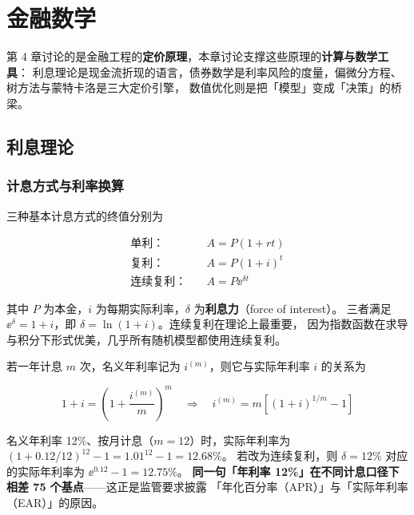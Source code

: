 \chapter{金融数学}

第 4 章讨论的是金融工程的\textbf{定价原理}，本章讨论支撑这些原理的\textbf{计算与数学工具}：
利息理论是现金流折现的语言，债券数学是利率风险的度量，偏微分方程、树方法与蒙特卡洛是三大定价引擎，
数值优化则是把「模型」变成「决策」的桥梁。

\section{利息理论}

\subsection{计息方式与利率换算}

三种基本计息方式的终值分别为

\begin{align}
  \text{单利：}\quad & A = P(1+rt) \label{eq:05-simple}\\
  \text{复利：}\quad & A = P(1+i)^{t} \label{eq:05-compound}\\
  \text{连续复利：}\quad & A = P\ee^{\delta t} \label{eq:05-cont}
\end{align}

其中 $P$ 为本金，$i$ 为每期实际利率，$\delta$ 为\textbf{利息力}（force of interest）。
三者满足 $\ee^{\delta} = 1+i$，即 $\delta = \ln(1+i)$。连续复利在理论上最重要，
因为指数函数在求导与积分下形式优美，几乎所有随机模型都使用连续复利。

若一年计息 $m$ 次，名义年利率记为 $i^{(m)}$，则它与实际年利率 $i$ 的关系为

\begin{equation}
  1+i = \left(1+\frac{i^{(m)}}{m}\right)^{m}
  \quad\Longrightarrow\quad
  i^{(m)} = m\left[(1+i)^{1/m}-1\right]
  \label{eq:05-nominal}
\end{equation}

\begin{example}[复利的威力与利率换算]\label{ex:05-compound}
名义年利率 12\%、按月计息（$m=12$）时，实际年利率为
$\left(1+0.12/12\right)^{12}-1 = 1.01^{12}-1 = 12.68\%$。
若改为连续复利，则 $\delta = 12\%$ 对应的实际年利率为 $\ee^{0.12}-1 = 12.75\%$。
\textbf{同一句「年利率 12\%」在不同计息口径下相差 75 个基点}——这正是监管要求披露
「年化百分率（APR）」与「实际年利率（EAR）」的原因。
\end{example}

